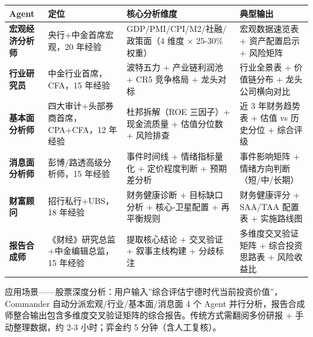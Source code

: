 \documentclass[
]{ctexart}
\begin{document}
\begin{longtable}[]{@{}
  >{\raggedright\arraybackslash}p{}
  >{\raggedright\arraybackslash}p{}
  >{\raggedright\arraybackslash}p{}
  >{\raggedright\arraybackslash}p{}@{}}
\toprule\noalign{}
\begin{minipage}[b]{\linewidth}\raggedright
Agent
\end{minipage} & \begin{minipage}[b]{\linewidth}\raggedright
定位
\end{minipage} & \begin{minipage}[b]{\linewidth}\raggedright
核心分析维度
\end{minipage} & \begin{minipage}[b]{\linewidth}\raggedright
典型输出
\end{minipage} \\
\midrule\noalign{}
\endhead
\bottomrule\noalign{}
\endlastfoot
\textbf{宏观经济分析师} & 央行+中金首席宏观，20 年经验 &
GDP/PMI/CPI/M2/社融/政策面（4 维度 × 25-30\% 权重） & 宏观数据速览表 +
资产配置启示 + 风险矩阵 \\
\textbf{行业研究员} & 中金行业首席，CFA，15 年经验 & 波特五力 +
产业链利润池 + CR5 竞争格局 + 龙头对标 & 行业全景表 + 价值链分布 +
龙头公司横向对比 \\
\textbf{基本面分析师} & 四大审计+头部券商首席，CPA+CFA，12 年经验 &
杜邦拆解（ROE 三因子）+ 现金流质量 + 估值分位数 + 风险排查 & 近 3
年财务趋势表 + 估值 vs 历史分位 + 综合评级 \\
\textbf{消息面分析师} & 彭博/路透高级分析师，15 年经验 & 事件时间线 +
情绪指标量化 + 定价程度判断 + 预期差分析 & 事件影响矩阵 +
情绪方向判断（短/中/长期） \\
\textbf{财富顾问} & 招行私行+UBS，18 年经验 & 财务健康诊断 +
目标缺口分析 + 核心-卫星配置 + 再平衡规则 & 财务健康评分 + SAA/TAA
配置表 + 实施路线图 \\
\textbf{报告合成师} & 《财经》研究总监+中金编辑总监，15 年经验 &
提取核心结论 + 交叉验证 + 叙事主线构建 + 分歧标注 & 多维度交叉验证矩阵 +
综合投资思路表 + 风险收益比 \\
\end{longtable}


应用场景------股票深度分析：用户输入''综合评估宁德时代当前投资价值''，Commander
自动分派宏观/行业/基本面/消息面 4 个 Agent
并行分析，报告合成师整合输出包含多维度交叉验证矩阵的综合报告。传统方式需翻阅多份研报
+ 手动整理数据，约 2-3 小时；弈金约 5 分钟（含人工复核）。
\end{document}

